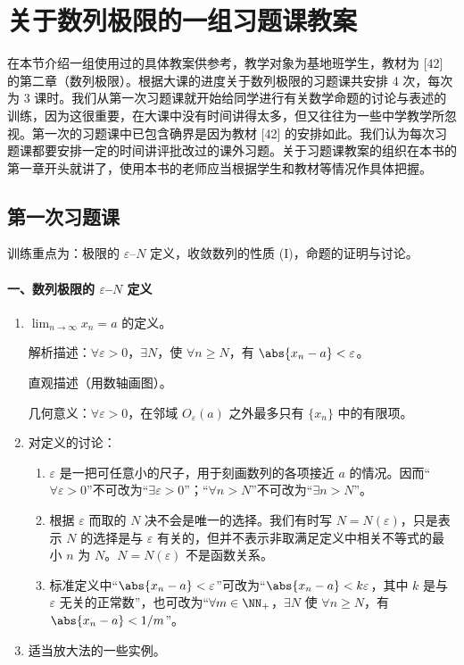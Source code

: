 \section{关于数列极限的一组习题课教案}

在本节介绍一组使用过的具体教案供参考，教学对象为基地班学生，教材为 [42] 的第二章（数列极限）。根据大课的进度关于数列极限的习题课共安排 4 次，每次为 3 课时。我们从第一次习题课就开始给同学进行有关数学命题的讨论与表述的训练，因为这很重要，在大课中没有时间讲得太多，但又往往为一些中学教学所忽视。第一次的习题课中已包含确界是因为教材 [42] 的安排如此。我们认为每次习题课都要安排一定的时间讲评批改过的课外习题。关于习题课教案的组织在本书的第一章开头就讲了，使用本书的老师应当根据学生和教材等情况作具体把握。

\subsection{第一次习题课}

训练重点为：极限的 $\varepsilon$--$N$ 定义，收敛数列的性质 (I)，命题的证明与讨论。

\paragraph{一、数列极限的 $\varepsilon$--$N$ 定义}

\begin{enumerate}[label=\arabic*.]
  \item $\displaystyle\lim_{n\to\infty}x_n=a$ 的定义。

  解析描述：$\forall\varepsilon>0$，$\exists N$，使 $\forall n\ge N$，有 $\abs{x_n-a}<\varepsilon$。

  直观描述（用数轴画图）。

  几何意义：$\forall\varepsilon>0$，在邻域 $O_\varepsilon(a)$ 之外最多只有 $\{x_n\}$ 中的有限项。

  \item 对定义的讨论：
  \begin{enumerate}[label=(\arabic*)]
    \item $\varepsilon$ 是一把可任意小的尺子，用于刻画数列的各项接近 $a$ 的情况。因而“$\forall\varepsilon>0$”不可改为“$\exists\varepsilon>0$”；“$\forall n>N$”不可改为“$\exists n>N$”。
    \item 根据 $\varepsilon$ 而取的 $N$ 决不会是唯一的选择。我们有时写 $N=N(\varepsilon)$，只是表示 $N$ 的选择是与 $\varepsilon$ 有关的，但并不表示非取满足定义中相关不等式的最小 $n$ 为 $N$。$N=N(\varepsilon)$ 不是函数关系。
    \item 标准定义中“$\abs{x_n-a}<\varepsilon$”可改为“$\abs{x_n-a}<k\varepsilon$，其中 $k$ 是与 $\varepsilon$ 无关的正常数”，也可改为“$\forall m\in\NN_+$，$\exists N$ 使 $\forall n\ge N$，有 $\abs{x_n-a}<1/m$”。
  \end{enumerate}

  \item 适当放大法的一些实例。
\end{enumerate}

